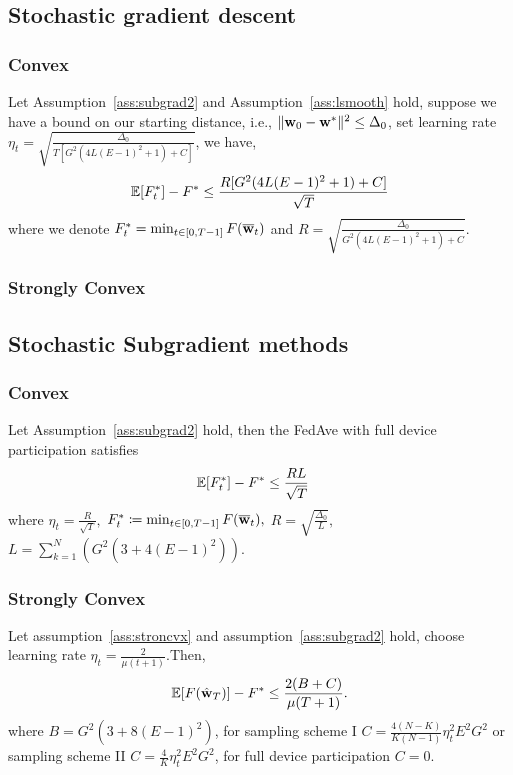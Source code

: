 \subsection{Stochastic gradient descent}
\subsubsection{Convex}
\begin{theorem}
Let Assumption~\ref{ass:subgrad2} and Assumption~\ref{ass:lsmooth} hold, suppose we have a bound 
on our starting distance, i.e., $\|{\mathbf{w}}_{0} - {\mathbf{w}}^*\|^2 \leq \Delta_0$, set learning rate $\eta_t = \sqrt{ \frac{\Delta_0}{ T [G^2( 4L(E-1)^2 + 1) + C] }}$, we have,
$$\mathbb{E}[ F_t^*] - F^*  \leq \frac{R [G^2( 4L(E-1)^2 + 1) + C] }{\sqrt{T}}$$
where we denote $F^*_t = \min_{t \in [0, T-1]} F({\overline{\mathbf{w}}}_t)$ and $R = \sqrt{ \frac{\Delta_0}{ G^2( 4L(E-1)^2 + 1) + C }}$.
\label{th:sgdcvxsmth}
\end{theorem}


\subsubsection{Strongly Convex}
\cite{li2019convergence}

\subsection{Stochastic Subgradient methods}

\subsubsection{Convex}
\begin{theorem}
	Let Assumption~\ref{ass:subgrad2} hold, 
	then the FedAve with full device participation satisfies
	\begin{align}
		 \mathbb{E}[F^*_t] - F^* &\leq \frac{RL}{\sqrt{T}}
	\end{align}
	where $\eta_t = \frac{R}{\sqrt{T}},$
	$F^*_t \coloneqq \min_{t \in [0, T-1]} F(\overline{{\mathbf{w}}}_t),$
	$R = \sqrt{ \frac{\Delta_0}{L}},$
	$L=\sum_{k=1}^N \left( G^2 \left(3 + 4(E-1)^2\right)\right).$
	\label{th:cvxnonsmoth}
\end{theorem}


\subsubsection{Strongly Convex}
\begin{theorem}
	Let assumption~\ref{ass:stroncvx} and assumption~\ref{ass:subgrad2} hold, choose learning rate $\eta_t = \frac{2}{\mu(t+1)} $.Then,
	\begin{align}
		\mathbb{E}[F(\hat{{\mathbf{w}}}_T)] - F^* \leq \frac{2(B + C)}{\mu(T+1)}.
	\end{align}
	where $B =  G^2 (3  + 8 (E-1)^2)$, for sampling scheme I $C =\frac{4(N - K)}{K(N-1)} \eta_t^2 E^2G^2 $ or
sampling scheme II $C = \frac{4}{K} \eta_t^2 E^2G^2$, for full device participation $C= 0$.
\end{theorem}


